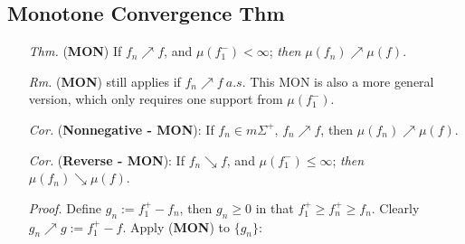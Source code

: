 \documentclass[a4paper,12pt,twoside]{book}
\begin{document}
\subsection{Monotone Convergence Thm}
\begin{itemize}
	\item[\textit{Thm.}] (\textbf{MON}) If $f_n \nearrow f$, and $\mu(f_1^-)<\infty$; \textit{then} $\mu(f_n)\nearrow \mu(f)$.

	\item[\textit{Rm.}] (\textbf{MON}) still applies if $f_n\nearrow f~a.s$. This MON is also a more general version, which only requires one support from $\mu(f_1^-)$.

	\item[\textit{Cor.}] (\textbf{Nonnegative - MON}): If ${f_n}\in m\Sigma^+$, $f_n \nearrow f$, then $\mu(f_n)\nearrow \mu(f)$.

	\item[\textit{Cor.}] (\textbf{Reverse - MON}): If $f_n \searrow f$, and $\mu(f^-_1)\leq \infty$; \textit{then} $\mu(f_n)\searrow \mu(f)$.
	\item[\textit{Proof.}] Define $g_n := f_1^+ - f_n$, then $g_n\geq 0$ in that $f_1^+ \geq f_n^+ \geq f_n$. Clearly $g_n \nearrow g:=f_1^+-f$. \newline
	Apply (\textbf{MON}) to $\{g_n\}$: 
\end{itemize}

\end{document}
